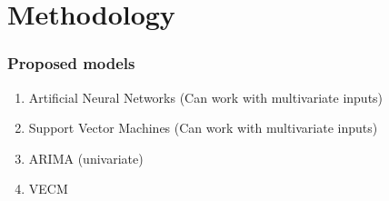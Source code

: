 \documentclass{beamer}
\begin{document}
\section{Methodology}
\begin{frame}
	\frametitle{Proposed models}
	\begin{enumerate}
		\item Artificial Neural Networks (Can work with multivariate inputs)
		\item Support Vector Machines (Can work with multivariate inputs)
		\item ARIMA (univariate)
		\item VECM
	\end{enumerate}
\end{frame}

\end{document}
